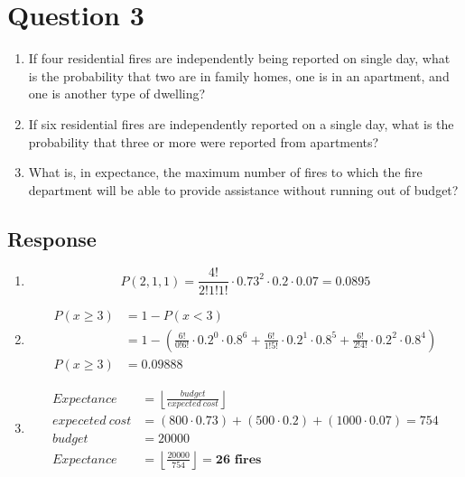 \documentclass[13pt]{article}
\begin{document}
\newpage
\section*{Question 3}
\begin{enumerate}[label=(\alph*)]
\item If four residential fires are independently being reported on single day,
  what is the probability that two are in family homes, one is in an apartment,
  and one is another type of dwelling?
\item If six residential fires are independently reported on a single day, what is
  the probability that three or more were reported from apartments?
\item What is, in expectance, the maximum number of fires to which the fire department
  will be able to provide assistance without running out of budget?
\end{enumerate}

\subsection*{Response}
\begin{enumerate}[label=(\alph*)]
\item \[P(2, 1, 1) = \frac{4!}{2!1!1!} \cdot 0.73^2 \cdot 0.2 \cdot 0.07 = 0.0895\]
\item
  \begin{align*}
    P(x \geq 3) &= 1 - P(x < 3) \\
                &= 1 - \left(\frac{6!}{0!6!} \cdot 0.2^0 \cdot 0.8^6
                  + \frac{6!}{1!5!} \cdot 0.2^1 \cdot 0.8^5
                  + \frac{6!}{2!4!} \cdot 0.2^2 \cdot 0.8^4\right) \\
    P(x \geq 3) &= \pmb{0.09888}
  \end{align*}

\item
  \begin{align*}
    Expectance &= \left\lfloor\frac{budget}{expected \ cost}\right\rfloor \\
    expeceted \ cost &= (800 \cdot 0.73) + (500 \cdot 0.2) + (1000 \cdot 0.07) = 754 \\
    budget &= 20000 \\
    Expectance &= \left\lfloor\frac{20000}{754}\right\rfloor = \pmb{26 \text{ fires}}
  \end{align*}
\end{enumerate}
\end{document}
